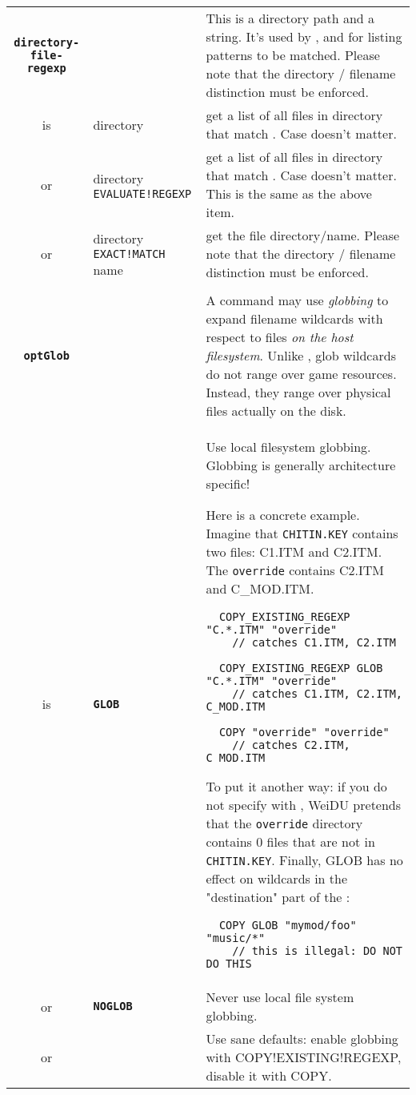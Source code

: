 \documentclass{article}
\def\ttref#1{\ahrefloc{#1}{\tt #1}}
\def\DEFINE#1{{\tt \bf #1}\label{#1}\index{#1}}
\def\t#1{{\tt #1}}
\begin{document}
\begin{tabular}{cp{10in}|p{10in}}
\DEFINE{directory-file-regexp} & & This is a directory path and a \ttref{regexp} string.
It's used by \ttref{MAKE!BIFF}, \ttref{ACTION!BASH!FOR} and \ttref{PATCH!BASH!FOR}
for listing patterns to be matched. Please note that
the directory / filename distinction must be enforced. \\
is & directory \ttref{regexp} & get a list of all files in directory that match \ttref{regexp}.
Case doesn't matter. \\
or & directory \t{EVALUATE!REGEXP} \ttref{regexp} & get a list of all files in directory that match \ttref{regexp}.
Case doesn't matter. This is the same as the above item. \\
or & directory \t{EXACT!MATCH} name & get the file directory/name. Please note that
the directory / filename distinction must be enforced. \\

\\
\DEFINE{optGlob} & &
  A \ttref{COPY} command may use \emph{globbing} to expand filename 
  wildcards with respect to files \emph{on the host filesystem}. Unlike
  \ttref{COPY!EXISTING!REGEXP}, glob wildcards do not range over game
  resources. Instead, they range over physical files actually on the disk. 
  \\
  is & \DEFINE{GLOB} & Use local filesystem globbing. Globbing is
  generally architecture specific!

  Here is a concrete example. Imagine that \t{CHITIN.KEY} contains 
  two files: C1.ITM and C2.ITM. The \t{override} contains C2.ITM and
  C\_MOD.ITM.
  \begin{verbatim}
  COPY_EXISTING_REGEXP "C.*.ITM" "override" 
    // catches C1.ITM, C2.ITM

  COPY_EXISTING_REGEXP GLOB "C.*.ITM" "override" 
    // catches C1.ITM, C2.ITM, C_MOD.ITM

  COPY "override" "override" 
    // catches C2.ITM, C_MOD.ITM
  \end{verbatim}
  To put it another way: if you do not specify \ttref{GLOB} with
  \ttref{COPY!EXISTING}, WeiDU pretends that the \t{override} directory
  contains 0 files that are not in \t{CHITIN.KEY}. Finally, GLOB has no
  effect on wildcards in the "destination" part of the \ttref{COPY}:
  \begin{verbatim}
  COPY GLOB "mymod/foo" "music/*"  
    // this is illegal: DO NOT DO THIS
  \end{verbatim}
  
  \\
  or & \DEFINE{NOGLOB} & Never use local file system globbing. \\
  or & & Use sane defaults: enable globbing with COPY!EXISTING!REGEXP, disable
  it with COPY. \\


\end{tabular}
\end{document}
